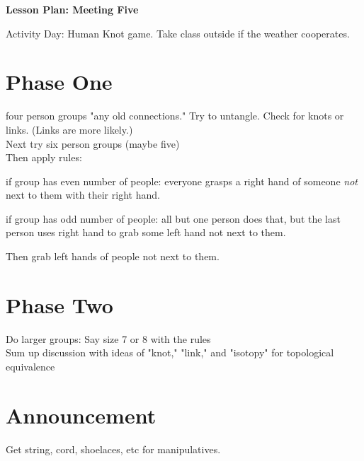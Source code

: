 \documentclass[12pt]{amsart}
\theoremstyle{definition}
\begin{document}
\begin{center}
\textbf{\Huge
Lesson Plan: Meeting Five
}
\end{center}
\vspace{.5in}

Activity Day: Human Knot game. Take class outside if the weather cooperates.

\section*{Phase One}
four person groups "any old connections."
Try to untangle.
Check for knots or links.
(Links are more likely.)\\

Next try six person groups (maybe five)\\

Then apply rules:
\begin{compactitem}
\item if group has even number of people: everyone grasps a right hand of someone \emph{not} next to them with their right hand.
\item if group has odd number of people: all but one person does that, but the last person uses right hand to grab some left hand not next to them.
\item Then grab left hands of people not next to them.
\end{compactitem}

\section*{Phase Two}
Do larger groups: Say size 7 or 8 with the rules \\

Sum up discussion with ideas of "knot," "link," and "isotopy" for topological equivalence


\section*{Announcement}

Get string, cord, shoelaces, etc for manipulatives.
\end{document}
